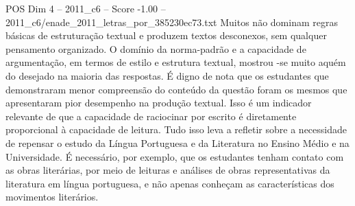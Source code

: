 \begin{textsample}{POS Dim 4 – 2011\_c6 – Score -1.00 – 2011\_c6/enade\_2011\_letras\_por\_385230ec73.txt}
Muitos não dominam regras básicas de estruturação textual e produzem textos desconexos, sem qualquer pensamento organizado.
O domínio da norma-padrão e a capacidade de argumentação, em termos de estilo e estrutura textual, mostrou -se muito aquém do desejado na maioria das respostas.
É digno de nota que os estudantes que demonstraram menor compreensão do conteúdo da questão foram os mesmos que apresentaram pior desempenho na produção textual.
Isso é um indicador relevante de que a capacidade de raciocinar por escrito é diretamente proporcional à capacidade de leitura.
Tudo isso leva a refletir sobre a necessidade de repensar o estudo da Língua Portuguesa e da Literatura no Ensino Médio e na Universidade.
É necessário, por exemplo, que os estudantes tenham contato com as obras literárias, por meio de leituras e análises de obras representativas da literatura em língua portuguesa, e não apenas conheçam as características dos movimentos literários.

\end{textsample}

